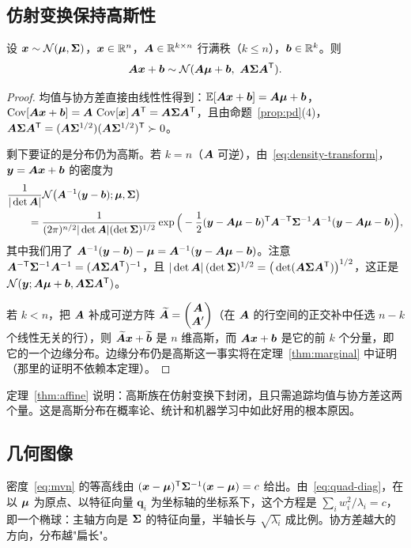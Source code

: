 \subsection{仿射变换保持高斯性}

\begin{theorem}[仿射变换]\label{thm:affine}
设 $\bm{x}\sim\mathcal{N}(\bm{\mu},\bm{\Sigma})$，$\bm{x}\in\mathbb{R}^n$，$\bm{A}\in\mathbb{R}^{k\times n}$ 行满秩（$k\le n$），$\bm{b}\in\mathbb{R}^k$。则
\[
\mA\vx+\vb\sim\Normal(\mA\vmu+\vb,\ \mA\mSigma\mA^\T).
\]
\end{theorem}

\begin{proof}
均值与协方差直接由线性性得到：$\mathbb{E}[\bm{A}\bm{x}+\bm{b}]=\bm{A}\bm{\mu}+\bm{b}$，$\operatorname{Cov}[\bm{A}\bm{x}+\bm{b}]=\bm{A}\,\operatorname{Cov}[\bm{x}]\,\bm{A}^{\mathsf{T}}=\bm{A}\bm{\Sigma}\bm{A}^{\mathsf{T}}$，且由命题~\ref{prop:pd}(4)，$\bm{A}\bm{\Sigma}\bm{A}^{\mathsf{T}}=(\bm{A}\bm{\Sigma}^{1/2})(\bm{A}\bm{\Sigma}^{1/2})^{\mathsf{T}}\succ 0$。

剩下要证的是分布仍为高斯。若 $k=n$（$\bm{A}$ 可逆），由~\eqref{eq:density-transform}，$\bm{y}=\bm{A}\bm{x}+\bm{b}$ 的密度为
\begin{align*}
&\frac{1}{|\det\bm{A}|}\mathcal{N}\big(\bm{A}^{-1}(\bm{y}-\bm{b});\bm{\mu},\bm{\Sigma}\big)\\
&\qquad=\frac{1}{(2\pi)^{n/2}|\det\bm{A}|(\det\bm{\Sigma})^{1/2}}
\exp\Big(-\frac12(\bm{y}-\bm{A}\bm{\mu}-\bm{b})^{\mathsf{T}}\bm{A}^{-\mathsf{T}}\bm{\Sigma}^{-1}\bm{A}^{-1}(\bm{y}-\bm{A}\bm{\mu}-\bm{b})\Big),
\end{align*}
其中我们用了 $\bm{A}^{-1}(\bm{y}-\bm{b})-\bm{\mu}=\bm{A}^{-1}(\bm{y}-\bm{A}\bm{\mu}-\bm{b})$。注意 $\bm{A}^{-\mathsf{T}}\bm{\Sigma}^{-1}\bm{A}^{-1}=(\bm{A}\bm{\Sigma}\bm{A}^{\mathsf{T}})^{-1}$，且 $|\det\bm{A}|\,(\det\bm{\Sigma})^{1/2}=\big(\det(\bm{A}\bm{\Sigma}\bm{A}^{\mathsf{T}})\big)^{1/2}$，这正是 $\mathcal{N}(\bm{y};\bm{A}\bm{\mu}+\bm{b},\bm{A}\bm{\Sigma}\bm{A}^{\mathsf{T}})$。

若 $k<n$，把 $\bm{A}$ 补成可逆方阵 $\widetilde{\bm{A}}=\begin{pmatrix}\bm{A}\\ \bm{A}'\end{pmatrix}$（在 $\bm{A}$ 的行空间的正交补中任选 $n-k$ 个线性无关的行），则 $\widetilde{\bm{A}}\bm{x}+\widetilde{\bm{b}}$ 是 $n$ 维高斯，而 $\bm{A}\bm{x}+\bm{b}$ 是它的前 $k$ 个分量，即它的一个边缘分布。边缘分布仍是高斯这一事实将在定理~\ref{thm:marginal} 中证明（那里的证明不依赖本定理）。
\end{proof}

\begin{remark}
定理~\ref{thm:affine} 说明：高斯族在仿射变换下封闭，且只需追踪均值与协方差这两个量。这是高斯分布在概率论、统计和机器学习中如此好用的根本原因。
\end{remark}

\subsection{几何图像}

密度~\eqref{eq:mvn} 的等高线由 $(\bm{x}-\bm{\mu})^{\mathsf{T}}\bm{\Sigma}^{-1}(\bm{x}-\bm{\mu})=c$ 给出。由~\eqref{eq:quad-diag}，在以 $\bm{\mu}$ 为原点、以特征向量 $\bm{q}_i$ 为坐标轴的坐标系下，这个方程是 $\sum_i w_i^2/\lambda_i=c$，即一个椭球：主轴方向是 $\bm{\Sigma}$ 的特征向量，半轴长与 $\sqrt{\lambda_i}$ 成比例。协方差越大的方向，分布越"扁长"。

